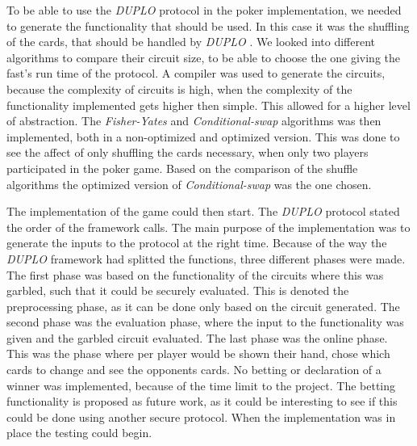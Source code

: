 \documentclass[twoside,11pt,openright]{report}
\newcommand{\FY}{\textit{Fisher-Yates} }
\newcommand{\CS}{\textit{Conditional-swap} }
\newcommand{\DUPLO}{\textit{DUPLO} }
\begin{document}
To be able to use the \DUPLO protocol in the poker implementation, we needed to generate the functionality that should be used. In this case it was the shuffling of the cards, that should be handled by \DUPLO. We looked into different algorithms to compare their circuit size, to be able to choose the one giving the fast's run time of the protocol. A compiler was used to generate the circuits, because the complexity of circuits is high, when the complexity of the functionality implemented gets higher then simple. This allowed for a higher level of abstraction. The \FY and \CS algorithms was then implemented, both in a non-optimized and optimized version. This was done to see the affect of only shuffling the cards necessary, when only two players participated in the poker game. Based on the comparison of the shuffle algorithms the optimized version of \CS was the one chosen.

The implementation of the game could then start. The \DUPLO protocol stated the order of the framework calls. The main purpose of the implementation was to generate the inputs to the protocol at the right time. Because of the way the \DUPLO framework had splitted the functions, three different phases were made. The first phase was based on the functionality of the circuits where this was garbled, such that it could be securely evaluated. This is denoted the preprocessing phase, as it can be done only based on the circuit generated. The second phase was the evaluation phase, where the input to the functionality was given and the garbled circuit evaluated. The last phase was the online phase. This was the phase where per player would be shown their hand, chose which cards to change and see the opponents cards. No betting or declaration of a winner was implemented, because of the time limit to the project. The betting functionality is proposed as future work, as it could be interesting to see if this could be done using another secure protocol. When the implementation was in place the testing could begin.
\end{document}
